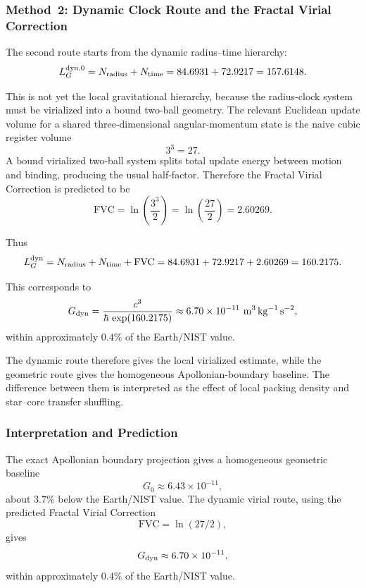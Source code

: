 \documentclass[11pt,a4paper]{article}
\begin{document}
    \subsubsection{Method~2: Dynamic Clock Route and the Fractal Virial Correction}

      The second route starts from the dynamic radius--time hierarchy:
      \[
      L_G^{\rm dyn,0}
      =
      N_{\rm radius}+N_{\rm time}
      =
      84.6931+72.9217
      =
      157.6148.
      \]

      This is not yet the local gravitational hierarchy, because the radius-clock system must be virialized into a bound two-ball geometry. The relevant Euclidean update volume for a shared three-dimensional angular-momentum state is the naive cubic register volume
      \[
      3^3=27.
      \]
      A bound virialized two-ball system splits total update energy between motion and binding, producing the usual half-factor. Therefore the Fractal Virial Correction is predicted to be
      \[
      \boxed{
      \mathrm{FVC}
      =
      \ln\left(\frac{3^3}{2}\right)
      =
      \ln\left(\frac{27}{2}\right)
      =
      2.60269.
      }
      \]

      Thus
      \[
      L_G^{\rm dyn}
      =
      N_{\rm radius}
      +
      N_{\rm time}
      +
      \mathrm{FVC}
      =
      84.6931
      +
      72.9217
      +
      2.60269
      =
      160.2175.
      \]

      This corresponds to
      \[
      G_{\rm dyn}
      =
      \frac{c^3}{\hbar\,\exp(160.2175)}
      \approx
      6.70\times10^{-11}\ {\rm m^3\,kg^{-1}\,s^{-2}},
      \]
      within approximately \(0.4\%\) of the Earth/NIST value.
      
      The dynamic route therefore gives the local virialized estimate, while the geometric route gives the homogeneous Apollonian-boundary baseline. The difference between them is interpreted as the effect of local packing density and star--core transfer shuffling.

    \subsubsection{Interpretation and Prediction}

      The exact Apollonian boundary projection gives a homogeneous geometric baseline
      \[
      G_0\approx6.43\times10^{-11},
      \]
      about \(3.7\%\) below the Earth/NIST value. The dynamic virial route, using the predicted Fractal Virial Correction
      \[
      \mathrm{FVC}=\ln(27/2),
      \]
      gives
      \[
      G_{\rm dyn}\approx6.70\times10^{-11},
      \]
      within approximately \(0.4\%\) of the Earth/NIST value.
\end{document}

